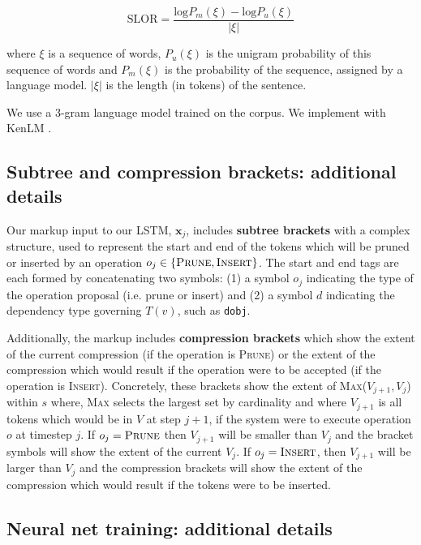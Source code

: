 \begin{equation}
\text{SLOR}=\frac{\text{log}P_m(\xi) - \text{log}P_u(\xi)}{|\xi|}
\end{equation}

where $\xi$ is a sequence of words, $P_u(\xi)$ is the unigram probability of this sequence of words and $P_m(\xi)$ is the probability of the sequence, assigned by a language model.  $|\xi|$ is the length (in tokens) of the sentence.

We use a 3-gram language model trained on the \citet{filippova2013overcoming} corpus. We implement with KenLM \cite{Heafield-kenlm}.

\subsection{Subtree and compression brackets: additional details}\label{s:subtree}

Our markup input to our LSTM, $\bm{x}_j$, includes \textbf{subtree brackets} with a complex structure, used to represent the start and end of the tokens which will be pruned or inserted by an operation $o_j \in \{ \textsc{Prune},\textsc{Insert}\}$. The start and end tags are each formed by concatenating two symbols: (1) a symbol $o_j$ indicating the type of the operation proposal (i.e. prune or insert) and (2) a symbol $d$ indicating the dependency type governing $T(v)$, such as \texttt{dobj}. 

Additionally, the markup includes \textbf{compression brackets} which show the extent of the current compression (if the operation is \textsc{Prune}) or the extent of the compression which would result if the operation were to be accepted (if the operation is \textsc{Insert}). Concretely, these brackets show the extent of \textsc{Max}($V_{j+1}, V_{j}$) within $s$ where, \textsc{Max} selects the largest set by cardinality and where $V_{j+1}$ is all tokens which would be in $V$ at step $j+1$, if the system were to execute operation $o$ at timestep $j$. If $o_j=\textsc{Prune}$ then $V_{j+1}$ will be smaller than $V_j$ and the bracket symbols will show the extent of the current $V_j$. If $o_j=\textsc{Insert}$, then $V_{j+1}$ will be larger than $V_j$ and the compression brackets will show the extent of the compression which would result if the tokens were to be inserted. 

\subsection{Neural net training: additional details}

